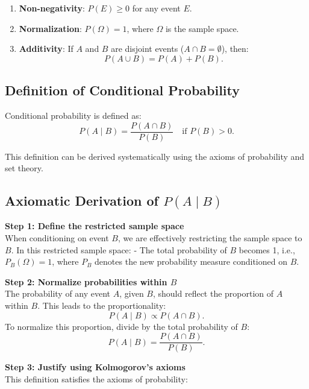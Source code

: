 \documentclass[
  12 pt,
  a4paper,
]{book}
\providecommand{\tightlist}{%
  \setlength{\itemsep}{0pt}\setlength{\parskip}{0pt}}
\numberwithin{equation}{section}
\theoremstyle{plain}      %
\theoremstyle{definition} %
\theoremstyle{remark}     %
\theoremstyle{note}         %
\begin{document}
\begin{enumerate}
\def\labelenumi{\arabic{enumi}.}
\tightlist
\item
  \textbf{Non-negativity}: \(P(E) \geq 0\) for any event \(E\).
\item
  \textbf{Normalization}: \(P(\Omega) = 1\), where \(\Omega\) is the
  sample space.
\item
  \textbf{Additivity}: If \(A\) and \(B\) are disjoint events
  (\(A \cap B = \emptyset\)), then: \[
  P(A \cup B) = P(A) + P(B).
  \]
\end{enumerate}

\hypertarget{definition-of-conditional-probability}{%
\subsection{Definition of Conditional
Probability}\label{definition-of-conditional-probability}}

Conditional probability is defined as: \[
P(A \mid B) = \frac{P(A \cap B)}{P(B)} \quad \text{if } P(B) > 0.
\]

This definition can be derived systematically using the axioms of
probability and set theory.

\hypertarget{axiomatic-derivation-of-pa-mid-b}{%
\subsection{\texorpdfstring{Axiomatic Derivation of
\(P(A \mid B)\)}{Axiomatic Derivation of P(A \textbackslash mid B)}}\label{axiomatic-derivation-of-pa-mid-b}}

\textbf{Step 1: Define the restricted sample space}\\
When conditioning on event \(B\), we are effectively restricting the
sample space to \(B\). In this restricted sample space: - The total
probability of \(B\) becomes 1, i.e., \(P_B(\Omega) = 1\), where \(P_B\)
denotes the new probability measure conditioned on \(B\).

\textbf{Step 2: Normalize probabilities within \(B\)}\\
The probability of any event \(A\), given \(B\), should reflect the
proportion of \(A\) within \(B\). This leads to the proportionality: \[
P(A \mid B) \propto P(A \cap B).
\] To normalize this proportion, divide by the total probability of
\(B\): \[
P(A \mid B) = \frac{P(A \cap B)}{P(B)}.
\]

\textbf{Step 3: Justify using Kolmogorov's axioms}\\
This definition satisfies the axioms of probability:
\end{document}
